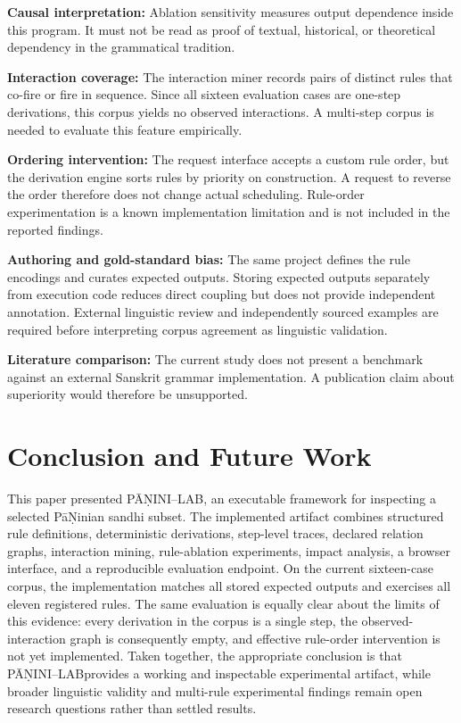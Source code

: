 \documentclass[conference]{IEEEtran}
\newcommand{\system}{P\={A}\d{N}INI--LAB}
\begin{document}
\textbf{Causal interpretation:} Ablation sensitivity measures output dependence inside this program. It must not be read as proof of textual, historical, or theoretical dependency in the grammatical tradition.

\textbf{Interaction coverage:} The interaction miner records pairs of distinct rules that co-fire or fire in sequence. Since all sixteen evaluation cases are one-step derivations, this corpus yields no observed interactions. A multi-step corpus is needed to evaluate this feature empirically.

\textbf{Ordering intervention:} The request interface accepts a custom rule order, but the derivation engine sorts rules by priority on construction. A request to reverse the order therefore does not change actual scheduling. Rule-order experimentation is a known implementation limitation and is not included in the reported findings.

\textbf{Authoring and gold-standard bias:} The same project defines the rule encodings and curates expected outputs. Storing expected outputs separately from execution code reduces direct coupling but does not provide independent annotation. External linguistic review and independently sourced examples are required before interpreting corpus agreement as linguistic validation.

\textbf{Literature comparison:} The current study does not present a benchmark against an external Sanskrit grammar implementation. A publication claim about superiority would therefore be unsupported.

\section{Conclusion and Future Work}
This paper presented \system, an executable framework for inspecting a selected P\={a}\d{N}inian sandhi subset. The implemented artifact combines structured rule definitions, deterministic derivations, step-level traces, declared relation graphs, interaction mining, rule-ablation experiments, impact analysis, a browser interface, and a reproducible evaluation endpoint. On the current sixteen-case corpus, the implementation matches all stored expected outputs and exercises all eleven registered rules. The same evaluation is equally clear about the limits of this evidence: every derivation in the corpus is a single step, the observed-interaction graph is consequently empty, and effective rule-order intervention is not yet implemented. Taken together, the appropriate conclusion is that \system provides a working and inspectable experimental artifact, while broader linguistic validity and multi-rule experimental findings remain open research questions rather than settled results.
\end{document}
